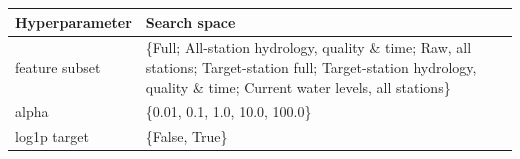 \begin{tabularx}{\textwidth}{@{}lX@{}}
\toprule
\textbf{Hyperparameter} & \textbf{Search space} \\
\midrule
feature subset & \{Full; All-station hydrology, quality \& time; Raw, all stations; Target-station full; Target-station hydrology, quality \& time; Current water levels, all stations\} \\
\addlinespace
alpha & \{0.01, 0.1, 1.0, 10.0, 100.0\} \\
\addlinespace
log1p target & \{False, True\} \\
\bottomrule
\end{tabularx}
